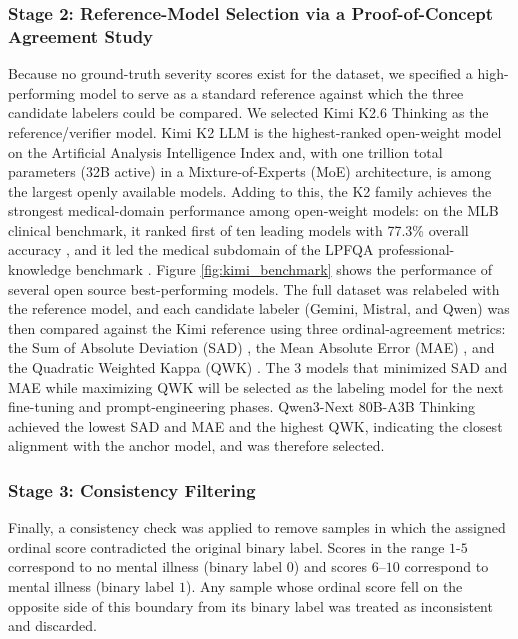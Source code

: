 \documentclass[conference]{IEEEtran}
\begin{document}
\subsubsection{Stage 2: Reference-Model Selection via a Proof-of-Concept Agreement Study} Because no ground-truth severity scores exist for the dataset, we specified a high-performing model to serve as a standard reference against which the three candidate labelers could be compared. We selected Kimi K2.6 Thinking \cite{kimiK2_2025} as the reference/verifier model. Kimi K2 \cite{kimiK2_2025} LLM is the highest-ranked open-weight model on the Artificial Analysis Intelligence Index \cite{artificialanalysis2026} and, with one trillion total parameters (32B active) in a Mixture-of-Experts (MoE) architecture, is among the largest openly available models. Adding to this, the K2 family achieves the strongest medical-domain performance among open-weight models: on the MLB clinical benchmark, it ranked first of ten leading models with 77.3\% overall accuracy \cite{mlb2026}, and it led the medical subdomain of the LPFQA professional-knowledge benchmark \cite{lpfqa2025}. Figure \ref{fig:kimi_benchmark} shows the performance of several open source best-performing models. The full dataset was relabeled with the reference model, and each candidate labeler (Gemini, Mistral, and Qwen) was then compared against the Kimi reference using three ordinal-agreement metrics: the Sum of Absolute Deviation (SAD) \cite{huber1964robust}, the Mean Absolute Error (MAE) \cite{willmott2005advantages}, and the Quadratic Weighted Kappa (QWK) \cite{articleQWK}. The 3 models that minimized SAD \cite{huber1964robust} and MAE \cite{willmott2005advantages} while maximizing QWK \cite{articleQWK} will be selected as the labeling model for the next fine-tuning and prompt-engineering phases. Qwen3-Next 80B-A3B Thinking \cite{qwen3next80ba3bthinking2025} achieved the lowest SAD and MAE and the highest QWK, indicating the closest alignment with the anchor model, and was therefore selected.

\subsubsection{Stage 3: Consistency Filtering}
Finally, a consistency check was applied to remove samples in which the assigned ordinal score contradicted the original binary label. Scores in the range $1$-$5$ correspond to no mental illness (binary label $0$) and scores $6$--$10$ correspond to mental illness (binary label $1$). Any sample whose ordinal score fell on the opposite side of this boundary from its binary label was treated as inconsistent and discarded. 
\end{document}
